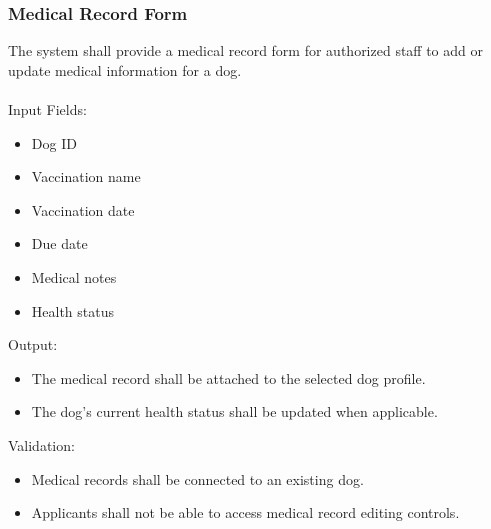 \documentclass[12pt]{article}
\begin{document}
\subsubsection{Medical Record Form}
The system shall provide a medical record form for authorized staff to add or update medical information for a dog.
\\
\\
Input Fields:
\begin{itemize}\item Dog ID\end{itemize}
\begin{itemize}\item Vaccination name\end{itemize}
\begin{itemize}\item Vaccination date\end{itemize}
\begin{itemize}\item Due date\end{itemize}
\begin{itemize}\item Medical notes\end{itemize}
\begin{itemize}\item Health status\end{itemize}
Output:
\begin{itemize}\item The medical record shall be attached to the selected dog profile.\end{itemize}
\begin{itemize}\item The dog’s current health status shall be updated when applicable.\end{itemize}
Validation:
\begin{itemize}\item Medical records shall be connected to an existing dog.\end{itemize}
\begin{itemize}\item Applicants shall not be able to access medical record editing controls.\end{itemize}
\end{document}
